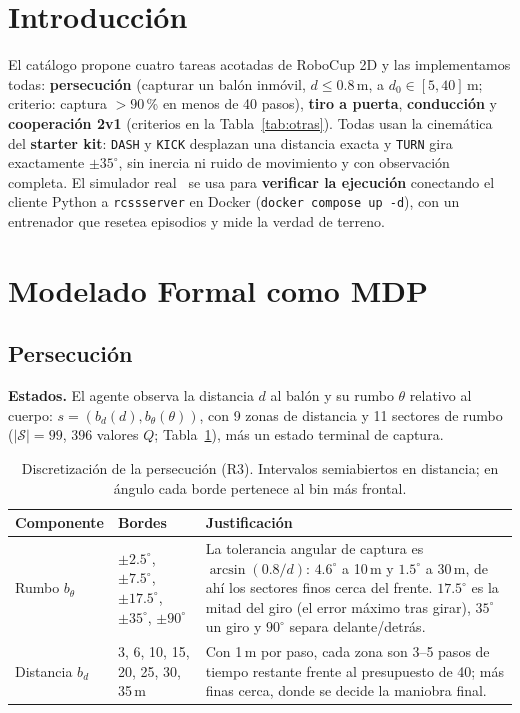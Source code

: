 \documentclass[11pt,a4paper]{article}
\begin{document}
\section{Introducción}

El catálogo propone cuatro tareas acotadas de RoboCup 2D y las implementamos todas: \textbf{persecución} (capturar un
balón inmóvil, $d \le 0.8$\,m, a $d_0 \in [5, 40]$\,m; criterio: captura $> 90$\,\% en menos de 40 pasos),
\textbf{tiro a puerta}, \textbf{conducción} y \textbf{cooperación 2v1} (criterios en la Tabla~\ref{tab:otras}). Todas
usan la cinemática del \textbf{starter kit}: \texttt{DASH} y \texttt{KICK} desplazan una distancia exacta y
\texttt{TURN} gira exactamente $\pm 35^\circ$, sin inercia ni ruido de movimiento y con observación completa. El
simulador real~\cite{robocup,rcssmanual} se usa para \textbf{verificar la ejecución} conectando el cliente Python a
\texttt{rcssserver} en Docker (\texttt{docker compose up -d}), con un entrenador que resetea episodios y mide la verdad
de terreno.

\section{Modelado Formal como MDP}

\subsection{Persecución}

\textbf{Estados.} El agente observa la distancia $d$ al balón y su rumbo $\theta$ relativo al cuerpo:
$s = (b_d(d), b_\theta(\theta))$, con 9 zonas de distancia y 11 sectores de rumbo ($|\mathcal{S}| = 99$, 396 valores
$Q$; Tabla~\ref{tab:bins}), más un estado terminal de captura.

\begin{table}[!htb]
\centering\small
\begin{tabularx}{\textwidth}{@{}l l X@{}}
\toprule
Componente & Bordes & Justificación \\
\midrule
Rumbo $b_\theta$ & $\pm 2.5^\circ$, $\pm 7.5^\circ$, $\pm 17.5^\circ$, $\pm 35^\circ$, $\pm 90^\circ$ & La tolerancia angular de captura es $\arcsin(0.8/d)$: $4.6^\circ$ a 10\,m y $1.5^\circ$ a 30\,m, de ahí los sectores finos cerca del frente. $17.5^\circ$ es la mitad del giro (el error máximo tras girar), $35^\circ$ un giro y $90^\circ$ separa delante/detrás. \\
Distancia $b_d$ & 3, 6, 10, 15, 20, 25, 30, 35\,m & Con 1\,m por paso, cada zona son 3--5 pasos de tiempo restante frente al presupuesto de 40; más finas cerca, donde se decide la maniobra final. \\
\bottomrule
\end{tabularx}
\caption{Discretización de la persecución (R3). Intervalos semiabiertos en distancia; en ángulo cada borde
pertenece al bin más frontal.}
\label{tab:bins}
\end{table}
\end{document}
